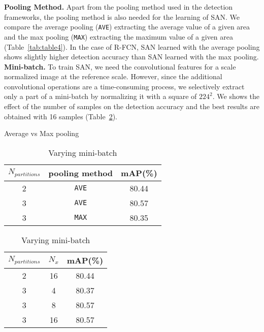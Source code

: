 \documentclass[runningheads]{llncs}
\begin{document}
\noindent
\textbf{Pooling Method.}
Apart from the pooling method used in the detection frameworks, the pooling method is also needed for the learning of SAN.
We compare the average pooling (\texttt{AVE}) extracting the average value of a given area and the max pooling (\texttt{MAX}) extracting the maximum value of a given area (Table~\ref{tab:table4}).
In the case of R-FCN, SAN learned with the average pooling shows slightly higher detection accuracy than SAN learned with the max pooling.
\\


\noindent
\textbf{Mini-batch.}
To train SAN, we need the convolutional features for a scale normalized image at the reference scale.
However, since the additional convolutional operations are a time-consuming process, we selectively extract only a part of a mini-batch by normalizing it with a square of $224^2$.
We shows the effect of the number of samples on the detection accuracy and the best results are obtained with 16 samples (Table~\ref{tab:table5}).
\\

\begin{table}[b]
	\centering
	\begin{minipage}[t]{.45\linewidth}
		\centering
		\caption{Average vs Max pooling}
		\begin{center}
			\begin{tabular}{c|c|c}
				\toprule %
				$N_{partitions}$ & pooling method & mAP(\%) \\
				\midrule %
				2 & \texttt{AVE} & 80.44 \\
				3 & \texttt{AVE} & 80.57 \\
				3 & \texttt{MAX} & 80.35 \\
				\bottomrule %
			\end{tabular}
		\end{center}
		\label{tab:table4}
	\end{minipage}
	\centering
	\begin{minipage}[t]{.45\linewidth}
		\centering
		\caption{Varying mini-batch}
		\begin{center}
			\begin{tabular}{c|c|c}
				\toprule %
				$N_{partitions}$ & $N_{x}$ & mAP(\%) \\
				\midrule %
				2 & 16 & 80.44 \\
				3 & 4 & 80.37 \\
				3 & 8 & 80.57 \\
				3 & 16 & 80.57 \\
				\bottomrule %
			\end{tabular}
		\end{center}
		\label{tab:table5}
	\end{minipage}
\end{table}
\end{document}
